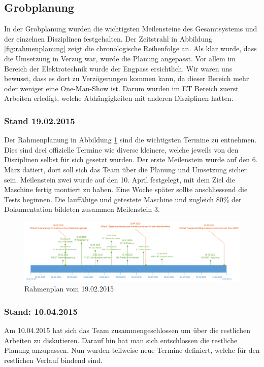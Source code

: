 \subsection{Grobplanung}
In der Grobplanung wurden die wichtigsten Meilensteine des Gesamtsystems und der einzelnen Disziplinen festgehalten.
Der Zeitstrahl in Abbildung \ref{fig:rahmenplanung} zeigt die chronologische Reihenfolge an. Als klar wurde, dass die Umsetzung in Verzug war, wurde die Planung angepasst. Vor allem im Bereich der Elektrotechnik wurde der Engpass ersichtlich. Wir waren uns bewusst, dass es dort zu Verzögerungen kommen kann, da dieser Bereich mehr oder weniger eine One-Man-Show ist. Darum wurden im ET Bereich zuerst Arbeiten erledigt, welche Abhängigkeiten mit anderen Disziplinen hatten.

\subsubsection{Stand 19.02.2015}
Der Rahmenplanung in Abbildung \ref{fig:rahmenplanung-19022015} sind die wichtigsten Termine zu entnehmen. Dies sind drei offizielle Termine wie diverse kleinere, welche jeweils von den Disziplinen selbst für sich gesetzt wurden. Der erste Meilenstein wurde auf den 6. März datiert, dort soll sich das Team über die Planung und Umsetzung sicher sein.
Meilenstein zwei wurde auf den 10. April festgelegt, mit dem Ziel die Maschine fertig montiert zu haben. Eine Woche später sollte anschliessend die Tests beginnen. Die lauffähige und getestete Maschine und zugleich 80\% der Dokumentation bildeten zusammen Meilenstein 3.

\begin{figure}[h!]
	\centering
	\includegraphics[width=1\linewidth]{../../fig/rahmenplanung}
	\caption{Rahmenplan vom 19.02.2015}
	\label{fig:rahmenplanung-19022015}
\end{figure}

\newpage
\subsubsection{Stand: 10.04.2015}
Am 10.04.2015 hat sich das Team zusammengeschlossen um über die restlichen Arbeiten zu diskutieren. Darauf hin hat man sich entschlossen die restliche Planung anzupassen. Nun wurden teilweise neue Termine definiert, welche für den restlichen Verlauf bindend sind.

